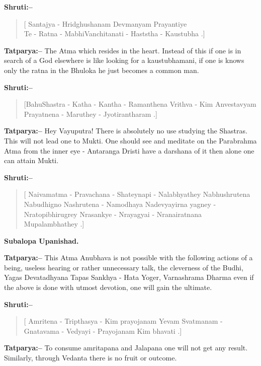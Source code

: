 \textbf{Shruti:–}

\begin{verse}
[ Santajya - Hridghushanam Devmanyam Prayantiye \\ Te - Ratna - MabhiVanchitanati - Haststha - Kaustubha .]
\end{verse}

\textbf{Tatparya:–} The Atma which resides in the heart. Instead of this if one is in search of a God elsewhere is like looking for a kaustubhamani, if one is knows only the ratna in the Bhuloka he just becomes a common man.

\textbf{Shruti:–}

\begin{verse}
[BahuShastra - Katha - Kantha - Ramanthena Vrithva - Kim  Anvestavyam Prayatnena - Maruthey - Jyotirantharam .]
\end{verse}

\textbf{Tatparya:–} Hey Vayuputra! There is absolutely no use studying the Shastras. This will not lead one to Mukti. One should see and meditate on the Parabrahma Atma from the inner eye - Antaranga Dristi have a darshana of it then alone one can attain Mukti.

\textbf{Shruti:–}

\begin{verse}
[ Naivamatma - Pravachana - Shateynapi - Nalabhyathey Nabhushrutena Nabudhigno Nashrutena - Namodhaya Nadevyayirna yagney - Nratopibhirugrey Nrasankye - Nrayagyai - Nranairatnana Mupalambhathey .]
\end{verse}

\begin{flushright}
\textbf{Subalopa Upanishad.}
\end{flushright}

\textbf{Tatparya:–} This Atma Anubhava is not possible with the following actions of a being, useless hearing or rather unnecessary talk, the cleverness of the Budhi, Yagas Devatadhyana Tapas Sankhya - Hata Yoger, Varnashrama Dharma even if the above is done with utmost devotion, one will gain the ultimate.

\textbf{Shruti:–}

\begin{verse}
[ Amritena - Tripthasya - Kim prayojanam  Yevam Svatmanam - Gnatavama - Vedyayi - Prayojanam Kim bhavati .]
\end{verse}

\textbf{Tatparya:–} To consume amritapana and Jalapana one will not get any result. Similarly, through Vedanta there is no fruit or outcome.

